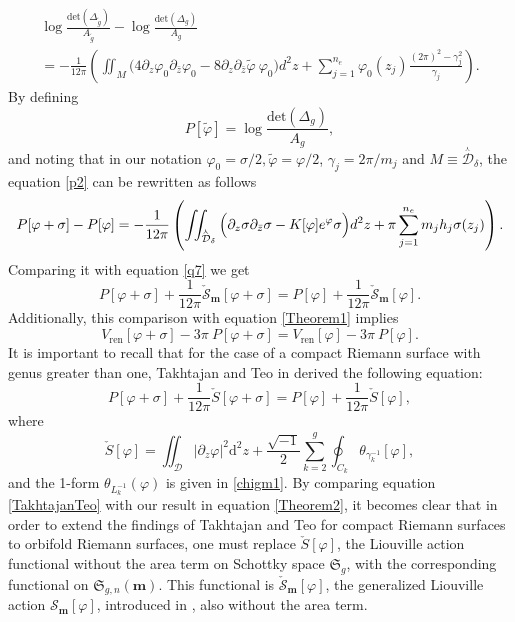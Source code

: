 \documentclass[a4paper,11pt]{article}
\newcommand{\dd}{\mathrm{d}}
\newcommand{\schottky}{\mathfrak{S}}
\newcommand{\SchottkyFund}{\mathcal{D}}
\newcommand{\singfund}{\overset{{}_{\curlywedge}}{\mathcal{D}}}
\begin{document}
\begin{multline}
\log\frac{\text{det}(\Delta_{\tilde{g}})}{A_{\tilde{g}}}- \log\frac{\text{det}(\Delta_{g})}{A_{g}}\\
=-\frac{1}{12\pi}\left(\iint_{M}\Big(4 \partial_{z}\varphi_0\partial_{\bar{z}}\varphi_0   -8\partial_{z}\partial_{\bar{z}}\tilde{\varphi} ~\varphi_0\Big) d^{2}z+ \sum_{j=1}^{n_
	e}\varphi_0(z_j)\frac{(2\pi)^2-\gamma_{j}^2}{\gamma_j}\right).\label{p2}
\end{multline}
By defining 
\begin{equation}
P[\tilde\varphi] =\log \frac{\text{det}(\Delta_{g})}{A_{g}},
\end{equation} 
and noting that in our notation $\varphi_0 = \sigma/2, \tilde{\varphi}=\varphi/2$, $\gamma_{j}= 2\pi/m_j$ and $M\equiv \singfund_{\delta}$, the equation \eqref{p2} can be rewritten as follows
\begin{equation}
P[\varphi+\sigma]-P[\varphi]\\
=-\frac{1}{12\pi}\left(\iint_{\singfund_{\delta}}\Big( \partial_{z}\sigma\partial_{\bar{z}}\sigma   -K[\varphi] e^{\varphi}\sigma\Big) d^{2}z+ \pi\sum_{j=1}^{n_
	e}m_j h_j\sigma(z_j)\right).\label{p3}
\end{equation}
Comparing it with equation \eqref{q7} we get
\begin{equation}
P[\varphi+\sigma]+\frac{1}{12\pi}\check{\mathscr{S}}_{\boldsymbol{m}}[\varphi+\sigma]=P[\varphi]  +\frac{1}{12\pi}\check{\mathscr{S}}_{\boldsymbol{m}}[\varphi]\label{Theorem2}.
\end{equation}
Additionally, this comparison with equation \eqref{Theorem1} implies
\begin{equation}
V_{\text{ren}}[\varphi+\sigma]-3\pi ~P[\varphi+\sigma]=V_{\text{ren}}[\varphi]-3\pi~P[\varphi].\label{Theorem2p}
\end{equation}
It is important to recall that for the case of a compact Riemann surface with genus greater than one, Takhtajan and Teo in \cite{Takhtajan_2003} derived the following equation:
\begin{equation}
P[\varphi+\sigma]+\frac{1}{12\pi}\check S[{\varphi+\sigma}]=P[\varphi]  +\frac{1}{12\pi}\check S[\varphi]\label{TakhtajanTeo},
\end{equation}
where
\begin{equation}
\check S[\varphi] = \iint_{\SchottkyFund} |\partial_z \varphi|^2 \dd^2{z}+ \frac{\sqrt{-1}}{2} \sum_{k=2}^{g} \oint_{C_k} \theta_{\gamma_k^{-1}}[\varphi],
\end{equation}
and the 1-form $\theta_{L_k^{-1}}(\varphi)$ is given in \eqref{chigm1}. By comparing equation \eqref{TakhtajanTeo} with our result in equation \eqref{Theorem2}, it becomes clear that in order to extend the findings of Takhtajan and Teo for compact Riemann surfaces to orbifold Riemann surfaces, one must replace $\check S[\varphi]$, the Liouville action functional without the area term on Schottky space $\schottky_{g}$, with the corresponding functional on $\schottky_{g,n}(\boldsymbol{m})$. This functional is $\check{\mathscr{S}}_{\boldsymbol{m}}[\varphi]$, the generalized Liouville action $\mathscr{S}_{\boldsymbol{m}}[\varphi]$, introduced in \cite{Taghavi2024classical}, also without the area term.
\end{document}
